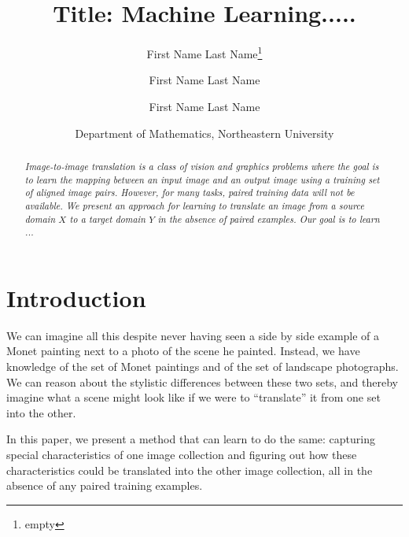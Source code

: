 \documentclass[10pt,letterpaper]{article}
\begin{document}
\title{Title: Machine Learning.....}

\author{
First Name Last Name\thanks{empty}
\and
First Name Last Name\footnotemark[1]
\and 
First Name Last Name
\and
Department of Mathematics, Northeastern University
}





\maketitle

\begin{abstract}
 
\textit{Image-to-image translation is a class of vision and graphics problems where the goal is to learn the mapping between an input image and an output image using a training set of aligned image pairs.   
However, for many tasks, paired training data will not be available.  We present an approach for learning to translate an image from a source domain $X$ to a target domain $Y$ in the absence of paired examples.  Our goal is to learn ...}
\end{abstract}

 


\section{Introduction}
 \label{Intro: }

 

We can imagine all this despite never having seen a side by side example of a Monet painting next to a photo of the scene he painted. Instead, we have knowledge of the set of Monet paintings and of the set of landscape photographs. We can reason about the stylistic differences between these two sets, and thereby imagine what a scene might look like if we were to ``translate'' it from one set into the other.

In this paper, we present a method that can learn to do the same: capturing special characteristics of one image collection and figuring out how these characteristics could be translated into the other image collection, all in the absence of any paired training examples. 
 
\end{document}
